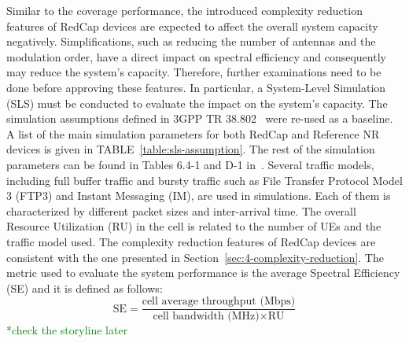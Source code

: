 \documentclass[]{IEEEtran}
\newcommand{\CAREPL}[2]{\textcolor{red}{#1}\textcolor{green}{#2}}
\begin{document}
Similar to the coverage performance, the introduced complexity reduction features of RedCap devices are expected to affect the overall system capacity negatively. 
Simplifications, such as reducing the number of antennas and the modulation order, have a direct impact on spectral efficiency and consequently may reduce the system's capacity. 
Therefore, further examinations need to be done before approving these features.
In particular, a System-Level Simulation (SLS) must be conducted to evaluate the impact on the system's capacity. 
The simulation assumptions defined in 3GPP TR 38.802~\cite{3gpp_study_nodate-2_38.802} were re-used as a baseline. 
A list of the main simulation parameters for both RedCap and Reference NR devices is given in TABLE~\ref{table:sls-assumption}. 
The rest of the simulation parameters can be found in Tables 6.4-1 and D-1 in~\cite{3gpp_study_2021_38.875}. 
Several traffic models, including full buffer traffic and bursty traffic such as File Transfer Protocol Model 3 (FTP3) and Instant Messaging (IM), are used in simulations. Each of them is characterized by different packet sizes and inter-arrival time. 
The overall Resource Utilization (RU) in the cell is related to the number of UEs and the traffic model used. The complexity reduction features of RedCap devices are consistent with the one presented in Section~\ref{sec:4-complexity-reduction}. The metric used to evaluate the system performance is the average Spectral Efficiency (SE) and it is defined as follows:
\begin{equation}
\textrm{SE}=\frac{\textrm{cell average throughput (Mbps)}}{\textrm{cell bandwidth (MHz)}\times\textrm{RU}}
\label{equ:spectral-efficiency}
\end{equation}
\CAREPL{}{*check the storyline later}
\end{document}
